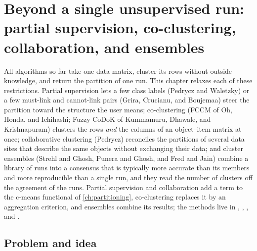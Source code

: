 \chapter[Beyond a single unsupervised run]{Beyond a single unsupervised run: partial supervision, co-clustering, collaboration, and ensembles}\label{ch:beyond}
\begin{roadmap}
All algorithms so far take one data matrix, cluster its rows without outside knowledge, and return the partition of one run. This chapter relaxes each of these restrictions. Partial supervision lets a few class labels (Pedrycz and Waletzky) or a few must-link and cannot-link pairs (Grira, Crucianu, and Boujemaa) steer the partition toward the structure the user means; co-clustering (FCCM of Oh, Honda, and Ichihashi; Fuzzy CoDoK of Kummamuru, Dhawale, and Krishnapuram) clusters the rows \emph{and} the columns of an object--item matrix at once; collaborative clustering (Pedrycz) reconciles the partitions of several data sites that describe the same objects without exchanging their data; and cluster ensembles (Strehl and Ghosh, Punera and Ghosh, and Fred and Jain) combine a library of runs into a consensus that is typically more accurate than its members and more reproducible than a single run, and they read the number of clusters off the agreement of the runs. Partial supervision and collaboration add a term to the c-means functional of \cref{ch:partitioning}, co-clustering replaces it by an aggregation criterion, and ensembles combine its results; the methods live in , , , and .
\end{roadmap}

\section{Problem and idea}\label{sec:beyond:problem}

